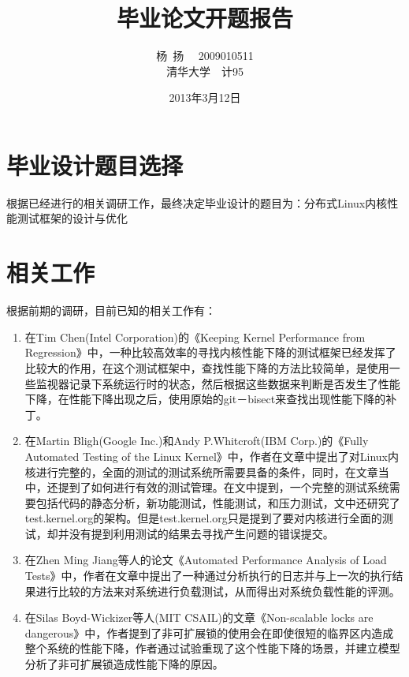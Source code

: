 \documentclass[CJK,12pt]{article}
\begin{document}
\title{\huge 毕业论文开题报告}

\author{杨\ 扬~~ 2009010511\\清华大学\ \ 计95 }
\date{2013年3月12日}
\maketitle

\pagestyle{fancy}

\section{毕业设计题目选择}
根据已经进行的相关调研工作，最终决定毕业设计的题目为：分布式Linux内核性能测试框架的设计与优化

\section{相关工作}
根据前期的调研，目前已知的相关工作有：

\begin{enumerate}
\item 在Tim Chen(Intel Corporation)的《Keeping Kernel Performance from Regression》中，一种比较高效率的寻找内核性能下降的测试框架已经发挥了比较大的作用，在这个测试框架中，查找性能下降的方法比较简单，是使用一些监视器记录下系统运行时的状态，然后根据这些数据来判断是否发生了性能下降，在性能下降出现之后，使用原始的git－bisect来查找出现性能下降的补丁。

\item 在Martin Bligh(Google Inc.)和Andy P.Whitcroft(IBM Corp.)的《Fully Automated Testing of the Linux Kernel》中，作者在文章中提出了对Linux内核进行完整的，全面的测试的测试系统所需要具备的条件，同时，在文章当中，还提到了如何进行有效的测试管理。在文中提到，一个完整的测试系统需要包括代码的静态分析，新功能测试，性能测试，和压力测试，文中还研究了test.kernel.org的架构。但是test.kernel.org只是提到了要对内核进行全面的测试，却并没有提到利用测试的结果去寻找产生问题的错误提交。

\item 在Zhen Ming Jiang等人的论文《Automated Performance Analysis of Load Tests》中，作者在文章中提出了一种通过分析执行的日志并与上一次的执行结果进行比较的方法来对系统进行负载测试，从而得出对系统负载性能的评测。

\item 在Silas Boyd-Wickizer等人(MIT CSAIL)的文章《Non-scalable locks are dangerous》中，作者提到了非可扩展锁的使用会在即使很短的临界区内造成整个系统的性能下降，作者通过试验重现了这个性能下降的场景，并建立模型分析了非可扩展锁造成性能下降的原因。
\end{enumerate}
\end{document}
